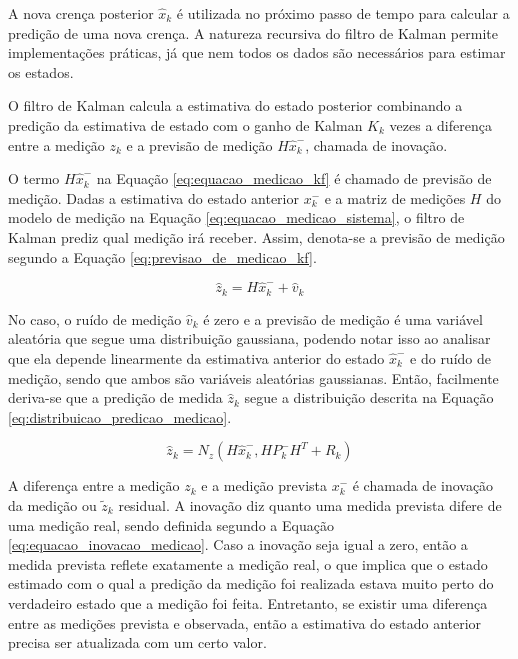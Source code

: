 \documentclass[acronym, symbols, table]{fei}
\begin{document}
				A nova crença posterior $\hat{x}_{k}$ é utilizada no próximo passo de tempo para calcular a predição de uma nova crença. A natureza recursiva do filtro de Kalman permite implementações práticas, já que nem todos os dados são necessários para estimar os estados.
				
				O filtro de Kalman calcula a estimativa do estado posterior combinando a predição da estimativa de estado com o ganho de Kalman $K_k$ vezes a diferença entre a medição $z_k$ e a previsão de medição $H\hat{x}_{k}^{-}$, chamada de inovação.
				
				O termo $H\hat{x}_{k}^{-}$ na Equação \eqref{eq:equacao_medicao_kf} é chamado de previsão de medição. Dadas a estimativa do estado anterior ${x}_{k}^{-}$ e a matriz de medições $H$ do modelo de medição na Equação \eqref{eq:equacao_medicao_sistema}, o filtro de Kalman prediz qual medição irá receber. Assim, denota-se a previsão de medição segundo a Equação \eqref{eq:previsao_de_medicao_kf}.
				
				\begin{equation} \label{eq:previsao_de_medicao_kf}
					\hat{z}_k = H\hat{x}_{k}^{-} + \hat{v}_k
				\end{equation}
			
				No caso, o ruído de medição $\hat{v}_k$ é zero e a previsão de medição é uma variável aleatória que segue uma distribuição gaussiana, podendo notar isso ao analisar que ela depende linearmente da estimativa anterior do estado $\hat{x}_{k}^{-}$ e do ruído de medição, sendo que ambos são variáveis aleatórias gaussianas. Então, facilmente deriva-se que a predição de medida $\hat{z}_k$ segue a distribuição descrita na Equação \eqref{eq:distribuicao_predicao_medicao}.
				
				\begin{equation} \label{eq:distribuicao_predicao_medicao}
					\hat{z}_k = N_z( H\hat{x}_{k}^{-}, HP_{k}^{-}H^T + R_k)
				\end{equation}
			
				A diferença entre a medição $z_k$ e a medição prevista $x_{k}^{-}$ é chamada de inovação da medição ou $\tilde{z}_k$ residual. A inovação diz quanto uma medida prevista difere de uma medição real, sendo definida segundo a Equação \eqref{eq:equacao_inovacao_medicao}. Caso a inovação seja igual a zero, então a medida prevista reflete exatamente a medição real, o que implica que o estado estimado com o qual a predição da medição foi realizada estava muito perto do verdadeiro estado que a medição foi feita. Entretanto, se existir uma diferença entre as medições prevista e observada, então a estimativa do estado anterior precisa ser atualizada com um certo valor.
				
\end{document}
